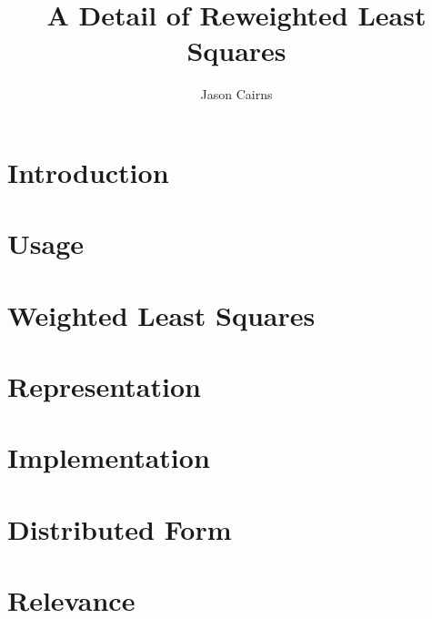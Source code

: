 \documentclass[a4paper,10pt]{article}
\begin{document}
\title{A Detail of Reweighted Least Squares}
\author{Jason Cairns}
  
\maketitle{}
\section{Introduction}
\section{Usage}
\section{Weighted Least Squares}
\label{sec:weight-least-squar}
\section{Representation}
\section{Implementation}
\label{sec:implementation}
\section{Distributed Form}
\section{Relevance}
\end{document}
